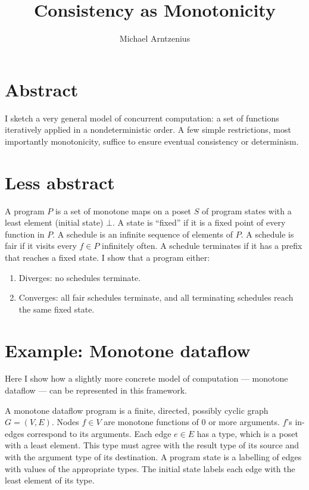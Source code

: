 \documentclass{article}
\newcommand{\todo}[1]{{\color{red}{#1}}}
\begin{document}
\title{Consistency as Monotonicity}
\author{Michael Arntzenius}
\date{}
\maketitle


\section{Abstract}

I sketch a very general model of concurrent computation: a set of functions
iteratively applied in a nondeterministic order. A few simple restrictions, most
importantly monotonicity, suffice to ensure eventual consistency or determinism.


\section{Less abstract}
\label{sec:less-abstract}

A program $P$ is a set of monotone maps on a poset $S$ of program states with a
least element (initial state) $\bot$. A state is ``fixed'' if it is a fixed
point of every function in $P$. A schedule is an infinite sequence of elements
of $P$. A schedule is fair if it visits every $f \in P$ infinitely often. A
schedule terminates if it has a prefix that reaches a fixed state. I \todo{hope
  to} show that a program either:

\begin{enumerate}
\item Diverges: no schedules terminate.
\item Converges: all fair schedules terminate, and all terminating schedules
  reach the same fixed state.
\end{enumerate}


\section{Example: Monotone dataflow}

Here I show how a slightly more concrete model of computation --- monotone
dataflow --- can be represented in this framework.

A monotone dataflow program is a finite, directed, possibly cyclic graph $G =
(V,E)$. Nodes $f \in V$ are monotone functions of 0 or more arguments. $f$'s
in-edges correspond to its arguments. Each edge $e \in E$ has a type, which is a
poset with a least element. This type must agree with the result type of its
source and with the argument type of its destination. A program state is a
labelling of edges with values of the appropriate types. The initial state
labels each edge with the least element of its type.
\end{document}
